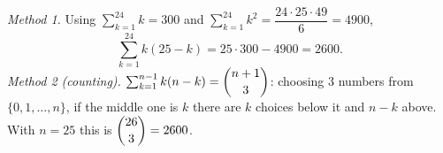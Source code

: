 \emph{Method 1.} Using $\sum_{k=1}^{24}k=300$ and $\sum_{k=1}^{24}k^2=\dfrac{24\cdot25\cdot49}{6}=4900$,
\[\sum_{k=1}^{24}k(25-k)=25\cdot300-4900=\boxed{2600}.\]
\emph{Method 2 (counting).} $\sum_{k=1}^{n-1}k(n-k)=\dbinom{n+1}{3}$: choosing $3$ numbers from $\{0,1,\dots,n\}$, if the middle one is $k$ there are $k$ choices below it and $n-k$ above. With $n=25$ this is $\dbinom{26}{3}=2600$.
